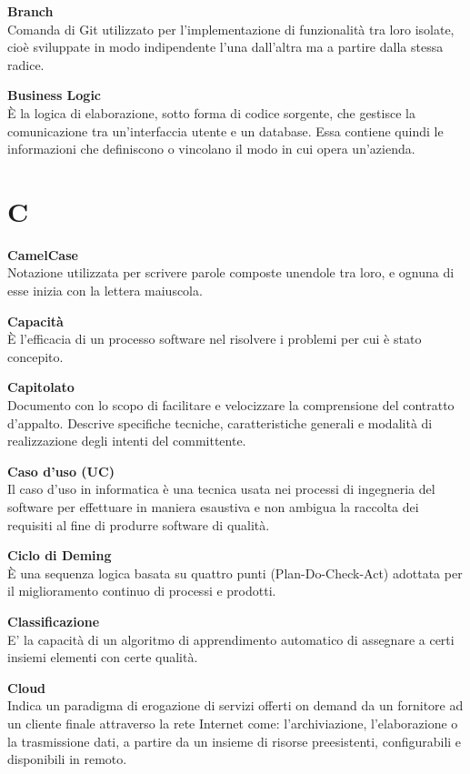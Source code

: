 \documentclass[a4paper, oneside, openany, dvipsnames, table, 12pt]{article}
\begin{document}
\textbf{Branch} \\
Comanda di Git utilizzato per l’implementazione di funzionalità tra loro isolate, cioè sviluppate in modo indipendente l’una dall’altra ma a partire dalla stessa radice.

\textbf{Business Logic} \\
È la logica di elaborazione, sotto forma di codice sorgente, che gestisce la comunicazione tra un'interfaccia utente e un database.
Essa contiene quindi le informazioni che definiscono o vincolano il modo in cui opera un'azienda.



\newpage
\section{C}
\textbf{CamelCase} \\
Notazione utilizzata per scrivere parole composte unendole tra loro, e ognuna di esse inizia con la lettera maiuscola.

\textbf{Capacità} \\
È l'efficacia di un processo software nel risolvere i problemi per cui è stato concepito.

\textbf{Capitolato}\\	
Documento con lo scopo di facilitare e velocizzare la comprensione del contratto d'appalto. Descrive specifiche tecniche, caratteristiche generali e modalità di realizzazione degli intenti del committente.

\textbf{Caso d'uso (UC)} \\
Il caso d'uso in informatica è una tecnica usata nei processi di ingegneria del software per effettuare in maniera esaustiva e non ambigua la raccolta dei requisiti al fine di produrre software di qualità.

\textbf{Ciclo di Deming}\\
È una sequenza logica basata su quattro punti (Plan-Do-Check-Act) adottata per il miglioramento continuo di processi e prodotti. 

\textbf{Classificazione} \\
 E’ la capacità di un algoritmo di apprendimento automatico di assegnare a certi insiemi elementi con certe qualità.

\textbf{Cloud} \\
Indica un paradigma di erogazione di servizi offerti on demand da un fornitore ad un cliente finale attraverso la rete Internet come: l'archiviazione, l'elaborazione o la trasmissione dati, a partire da un insieme di risorse preesistenti, configurabili e disponibili in remoto.
\end{document}
